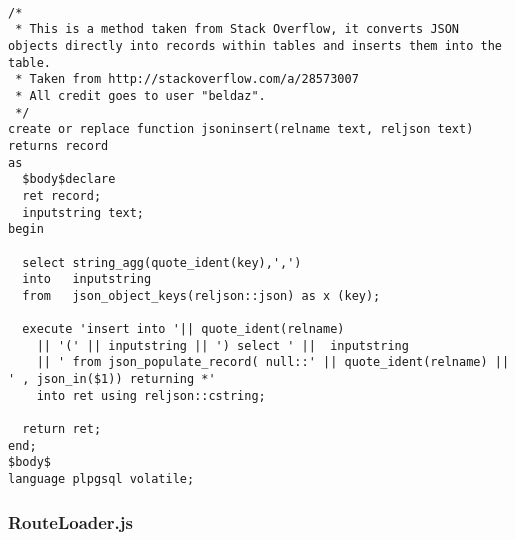 \lstsql
\begin{lstlisting}

/*
 * This is a method taken from Stack Overflow, it converts JSON objects directly into records within tables and inserts them into the table.
 * Taken from http://stackoverflow.com/a/28573007 
 * All credit goes to user "beldaz".
 */
create or replace function jsoninsert(relname text, reljson text) returns record 
as
  $body$declare
  ret record;
  inputstring text;
begin

  select string_agg(quote_ident(key),',') 
  into   inputstring
  from   json_object_keys(reljson::json) as x (key);

  execute 'insert into '|| quote_ident(relname) 
    || '(' || inputstring || ') select ' ||  inputstring 
    || ' from json_populate_record( null::' || quote_ident(relname) || ' , json_in($1)) returning *'
    into ret using reljson::cstring;

  return ret;
end;
$body$
language plpgsql volatile;

\end{lstlisting}


\subsubsection*{RouteLoader.js}


